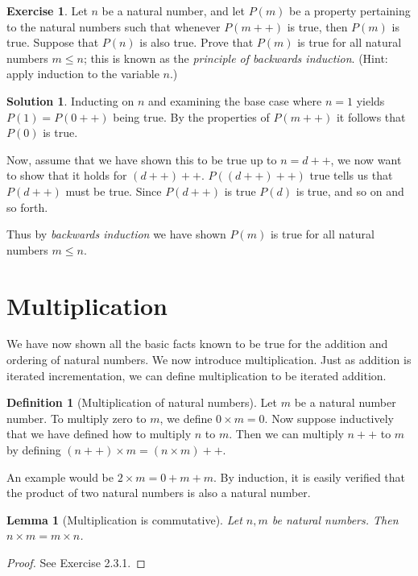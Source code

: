 \documentclass[a4paper, twocolumn]{report}
\newcounter{dummy} \numberwithin{dummy}{section}
\newcounter{exercise} \numberwithin{exercise}{section}
\newtheorem{lma}[dummy]{Lemma}
\theoremstyle{definition}
\newtheorem{defn}[dummy]{Definition}
\newtheorem{exc}[exercise]{Exercise}
\theoremstyle{solution}
\newtheorem*{sltn}{Solution}
\newcommand{\dplus}{{+}{+}} %
\begin{document}
\begin{exc}
  Let $n$ be a natural number, and let $P(m)$ be a property pertaining to the
  natural numbers such that whenever $P(m\dplus)$ is true, then $P(m)$ is true.
  Suppose that $P(n)$ is also true.  Prove that $P(m)$ is true for all natural
  numbers $m \leq n$; this is known as the \textit{principle of backwards
  induction}.  (Hint: apply induction to the variable $n$.)
\end{exc}

\begin{sltn}
  Inducting on $n$ and examining the base case where $n = 1$ yields $P(1) =
  P(0\dplus)$ being true.  By the properties of $P(m\dplus)$ it follows that $P(0)$
  is true.
  
  Now, assume that we have shown this to be true up to $n = d\dplus$, we now want
  to show that it holds for $(d\dplus)\dplus$.  $P((d\dplus)\dplus)$ true tells
  us that $P(d\dplus)$ must be true. Since $P(d\dplus)$ is true $P(d)$ is true,
  and so on and so forth.

  Thus by \textit{backwards induction} we have shown $P(m)$ is true for all
  natural numbers $m \leq n$. 
\end{sltn}

\section{Multiplication}

We have now shown all the basic facts known to be true for the addition and
ordering of natural numbers.  We now introduce multiplication. Just as addition
is iterated incrementation, we can define multiplication to be iterated
addition.

\begin{defn}[Multiplication of natural numbers]
  \label{defn_231}
  Let $m$ be a natural number number. To multiply zero to $m$, we define $0
  \times m = 0$. Now suppose inductively that we have defined how to multiply
  $n$ to $m$. Then we can multiply $n\dplus$ to $m$ by defining $\left( n\dplus
  \right) \times m = (n \times m)\dplus$.
\end{defn}

An example would be $2 \times m = 0 + m + m$. By induction, it is easily
verified that the product of two natural numbers is also a natural number.

\begin{lma}[Multiplication is commutative]
  \label{lma_232} 
  Let $n, m$ be natural numbers. Then $n \times m = m \times n$. 
\end{lma}
\begin{proof}
  See Exercise 2.3.1.
\end{proof}
\end{document}
